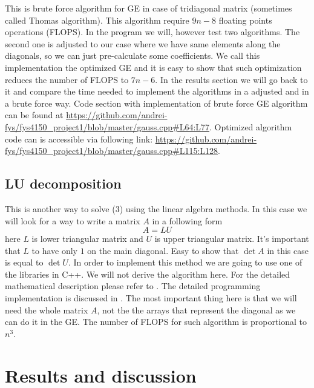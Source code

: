 \documentclass[10pt]{article}
\begin{document}
This is brute force algorithm for GE in case of tridiagonal matrix (sometimes called Thomas algorithm). This algorithm require $ 9n-8 $ floating points operations (FLOPS). In the program we will, however test two algorithms. The second one is adjusted to our case where we have same elements along the diagonals, so we can just pre-calculate some coefficients. We call this implementation the optimized GE and it is easy to show that such optimization reduces the number of FLOPS to $ 7n-6 $. In the results section we will go back to it and compare the time needed to implement the algorithms in a adjusted and in a brute force way. Code section with implementation of brute force GE algorithm can be found at \url{https://github.com/andrei-fys/fys4150_project1/blob/master/gauss.cpp#L64:L77}. Optimized algorithm code can is accessible via following link: \url{https://github.com/andrei-fys/fys4150_project1/blob/master/gauss.cpp#L115:L128}.

\subsection{LU decomposition}
This is another way to solve (3) using the linear algebra methods. In this case we will look for a way to write a matrix $ A $ in a following form
\begin{equation}
A=LU
\end{equation}
here $ L $ is lower triangular matrix and $ U $ is upper triangular matrix. It's important that $ L $ to have only $ 1 $ on the main diagonal. Easy to show that $ \det A $ in this case is equal to $ \det U $. In order to implement this method we are going to use one of the libraries in C++. We will not derive the algorithm here. For the detailed mathematical description please refer to \cite{one}. The detailed programming implementation is discussed in \cite{two}.
The most important thing here is that we will need the whole matrix $ A $, not the the arrays that represent the diagonal as we can do it in the GE. The number of FLOPS for such algorithm is proportional to $ n^{3} $.

\newpage
\section{Results and discussion}
\end{document}
